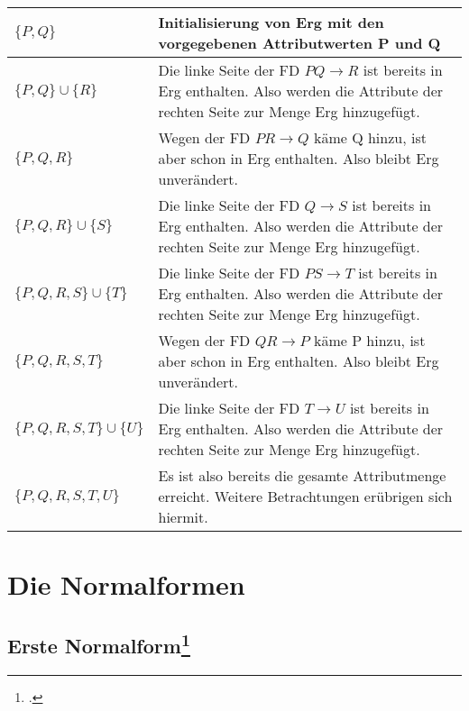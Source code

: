 \documentclass{lehramt-informatik-haupt}
\begin{document}
\noindent
\begin{tabularx}{\linewidth}{lX}
$\{P, Q\}$ &
Initialisierung von Erg mit den vorgegebenen Attributwerten P und Q
\\\hline

$\{P, Q\} \cup \{R\}$  &
Die linke Seite der FD $P Q \rightarrow R$ ist bereits in Erg enthalten.
Also werden die Attribute der rechten Seite zur Menge Erg hinzugefügt.
\\\hline

$\{P, Q, R\}$ &
Wegen der FD $PR \rightarrow Q$ käme Q hinzu, ist aber schon in Erg
enthalten. Also bleibt Erg unverändert.
\\\hline

$\{P, Q, R\} \cup \{S\}$ &
Die linke Seite der FD $Q \rightarrow S$ ist bereits in Erg enthalten.
Also werden die Attribute der rechten Seite zur Menge Erg hinzugefügt.
\\\hline

$\{P, Q, R, S\} \cup \{T\}$ &
Die linke Seite der FD $PS \rightarrow T$ ist bereits in Erg enthalten.
Also werden die Attribute der rechten Seite zur Menge Erg hinzugefügt.
\\\hline

$\{P, Q, R, S, T\}$ &
Wegen der FD $QR \rightarrow P$ käme P hinzu, ist aber schon in Erg
enthalten. Also bleibt Erg unverändert.
\\\hline

$\{P, Q, R, S, T\} \cup \{U\}$ &
Die linke Seite der FD $T \rightarrow U$ ist bereits in Erg enthalten.
Also werden die Attribute der rechten Seite zur Menge Erg hinzugefügt.
\\\hline

$\{P, Q, R, S, T, U\}$ &
Es ist also bereits die gesamte Attributmenge erreicht. Weitere
Betrachtungen erübrigen sich hiermit.
\\\hline
\end{tabularx}

\section{Die Normalformen}

%

\subsection{Erste Normalform\footcite[Seite 195]{winter}}
\end{document}
